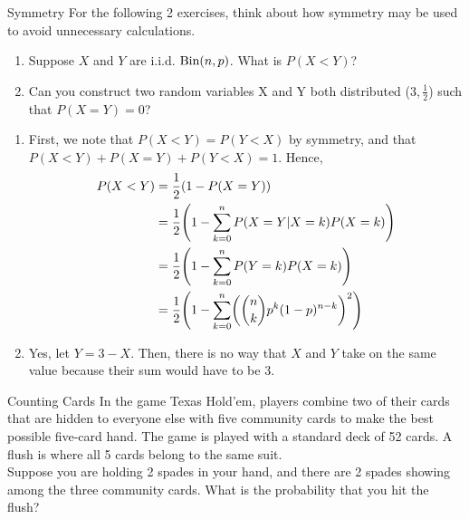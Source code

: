 \documentclass[11pt]{article}
\begin{document}
\begin{exercise}{Symmetry} For the following 2 exercises, think about how symmetry may be used to avoid unnecessary calculations. 
\begin{enumerate}[label=(\alph*)]
        \item Suppose $X$ and $Y$ are i.i.d. $\textrm{Bin}(n, p)$. What is $P(X < Y)$?
        \item Can you construct two random variables X and Y both distributed \Bin($3, \frac{1}{2}$) such that $P(X=Y)=0$?
\end{enumerate}
\end{exercise}
\begin{solution}{3}
\vspace{-5mm}
\begin{enumerate}[label=(\alph*)]
\item
First, we note that $P(X < Y) = P(Y < X)$ by symmetry, and that $P(X < Y) + P(X = Y) + P(Y < X) = 1$. Hence,
\begin{align*}
P(X < Y) &= \frac{1}{2}\paren{1 - P(X = Y)} \\
&= \frac{1}{2}\paren{1 - \sum_{k=0}^n P(X = Y | X = k)P(X = k)} \\
&= \frac{1}{2}\paren{1 - \sum_{k=0}^n P(Y = k)P(X = k)} \\
&= \frac{1}{2}\paren{1 - \sum_{k=0}^n\paren{\binom{n}{k}p^k(1 - p)^{n - k}}^2}
\end{align*}
\item
Yes, let $Y = 3 - X$. Then, there is no way that $X$ and $Y$ take on the same value because their sum would have to be 3. 
\end{enumerate}
\end{solution}

\begin{exercise}{Counting Cards}
In the game Texas Hold'em, players combine two of their cards that are hidden to everyone else with five community cards to make the best possible five-card hand. The game is played with a standard deck of 52 cards. A flush is where all 5 cards belong to the same suit. \\

Suppose you are holding 2 spades in your hand, and there are 2 spades showing among the three community cards. What is the probability that you hit the flush? 
\end{exercise}
\end{document}
